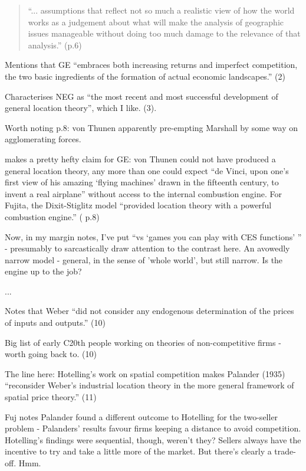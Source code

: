 \begin{quote}
``... assumptions that reflect not so much a realistic view of how the world works as a judgement about what will make the analysis of geographic issues manageable without doing too much damage to the relevance of that analysis.'' (p.6)
\end{quote}

Mentions that GE ``embraces both increasing returns and imperfect competition, the two basic ingredients of the formation of actual economic landscapes.'' (2)

Characterises NEG as ``the most recent and most successful development of general location theory'', which I like. (3).

Worth noting p.8: von Thunen apparently pre-empting Marshall by some way on agglomerating forces.

makes a pretty hefty claim for GE: von Thunen could not have produced a general location theory, any more than one could expect ``de Vinci, upon one's first view of his amazing `flying machines' drawn in the fifteenth century, to invent a real airplane'' without access to the internal combustion engine. For Fujita, the Dixit-Stiglitz model ``provided location theory with a powerful combustion engine.'' (\citealt{fujita_evolution_2010} p.8)

Now, in my margin notes, I've put ``vs `games you can play with CES functions' '' - presumably to sarcastically draw attention to the contrast here. An avowedly narrow model - general, in the sense of 'whole world', but still narrow. Is the engine up to the job?

...

Notes that Weber ``did not consider any endogenous determination of the prices of inputs and outputs.'' (10) 

Big list of early C20th people working on theories of non-competitive firms - worth going back to. (10)

The line here: Hotelling's work on spatial competition makes Palander (1935) ``reconsider Weber's industrial location theory in the more general framework of spatial price theory.'' (11)

Fuj notes Palander found a different outcome to Hotelling for the two-seller problem - Palanders' results favour firms keeping a distance to avoid competition. Hotelling's findings were sequential, though, weren't they? Sellers always have the incentive to try and take a little more of the market. But there's clearly a trade-off. Hmm. 

